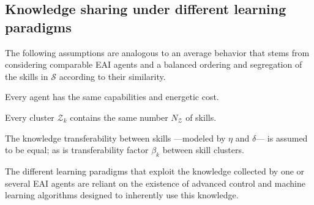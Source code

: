 \subsection{Knowledge sharing under different learning paradigms}
The following assumptions are analogous to an average behavior that stems from considering comparable EAI agents and a balanced ordering and segregation of the skills in $\mathcal{S}$ according to their similarity.
\begin{tcolorbox}
	\begin{assumption}\label{assumption:agent_similarity}
		Every agent has the same capabilities and energetic cost.
	\end{assumption}
\end{tcolorbox}
\begin{tcolorbox}
	\begin{assumption}\label{assumption:cluster_size}
		Every cluster $\mathcal{Z}_{k}$ contains the same number $N_{\mathcal{Z}} $ of skills.
	\end{assumption}
\end{tcolorbox}
\begin{tcolorbox}
	\begin{assumption}\label{assumption:cluster_transferability}
		The knowledge transferability between skills ---modeled by $\eta$ and $\delta$--- is assumed to be equal; as is transferability factor $\beta_{k}$ between skill clusters.
	\end{assumption}
\end{tcolorbox}

\begin{tcolorbox}
	\begin{assumption}\label{assumption:enabling_agorithms}
		The different learning paradigms that exploit the knowledge collected by one or several EAI agents are reliant on the existence of advanced control and machine learning algorithms designed to inherently use this knowledge.
	\end{assumption}
\end{tcolorbox}

